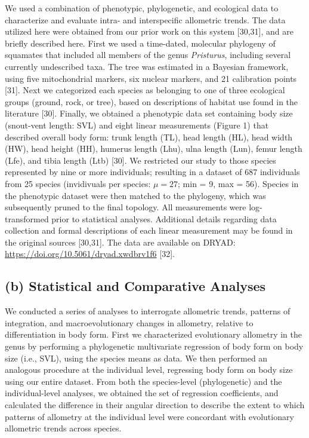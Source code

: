 \documentclass[
  11pt,
]{article}
\begin{document}
We used a combination of phenotypic, phylogenetic, and ecological data
to characterize and evaluate intra- and interspecific allometric trends.
The data utilized here were obtained from our prior work on this system
{[}30,31{]}, and are briefly described here. First we used a time-dated,
molecular phylogeny of squamates that included all members of the genus
\emph{Pristurus}, including several currently undescribed taxa. The tree
was estimated in a Bayesian framework, using five mitochondrial markers,
six nuclear markers, and 21 calibration points {[}31{]}. Next we
categorized each species as belonging to one of three ecological groups
(ground, rock, or tree), based on descriptions of habitat use found in
the literature {[}30{]}. Finally, we obtained a phenotypic data set
containing body size (snout-vent length: SVL) and eight linear
measurements (Figure 1) that described overall body form: trunk length
(TL), head length (HL), head width (HW), head height (HH), humerus
length (Lhu), ulna length (Lun), femur length (Lfe), and tibia length
(Ltb) {[}30{]}. We restricted our study to those species represented by
nine or more individuals; resulting in a dataset of 687 individuals from
25 species (invidivuals per species: \(\mu=27\); min = 9, max = 56).
Species in the phenotypic dataset were then matched to the phylogeny,
which was subsequently pruned to the final topology. All measurements
were log-transformed prior to statistical analyses. Additional details
regarding data collection and formal descriptions of each linear
measurement may be found in the original sources {[}30,31{]}. The data
are available on DRYAD: \url{https://doi.org/10.5061/dryad.xwdbrv1f6}
{[}32{]}.

\hypertarget{b-statistical-and-comparative-analyses}{%
\subsection{(b) Statistical and Comparative
Analyses}\label{b-statistical-and-comparative-analyses}}

We conducted a series of analyses to interrogate allometric trends,
patterns of integration, and macroevolutionary changes in allometry,
relative to differentiation in body form. First we characterized
evolutionary allometry in the genus by performing a phylogenetic
multivariate regression of body form on body size (i.e., SVL), using the
species means as data. We then performed an analogous procedure at the
individual level, regressing body form on body size using our entire
dataset. From both the species-level (phylogenetic) and the
individual-level analyses, we obtained the set of regression
coefficients, and calculated the difference in their angular direction
to describe the extent to which patterns of allometry at the individual
level were concordant with evolutionary allometric trends across
species. \hfill\break
\end{document}
